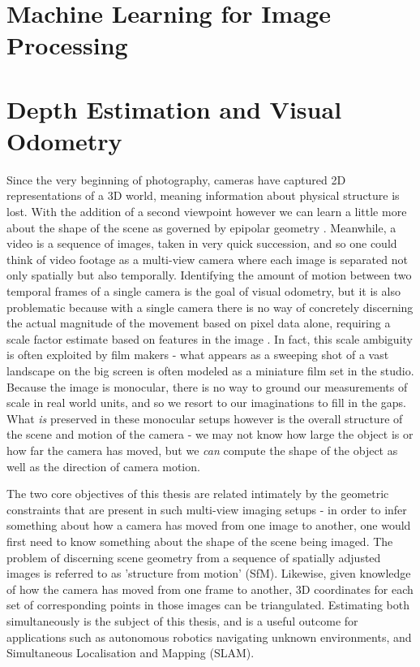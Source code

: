 \documentclass[openany]{book}
\begin{document}
\section{Machine Learning for Image Processing}



\section{Depth Estimation and Visual Odometry}

Since the very beginning of photography, cameras have captured 2D representations of a 3D world, meaning information about physical structure is lost. With the addition of a second viewpoint however we can learn a little more about the shape of the scene as governed by epipolar geometry \cite{zisserman2004multiview}. Meanwhile, a video is a sequence of images, taken in very quick succession, and so one could think of video footage as a multi-view camera where each image is separated not only spatially but also temporally. Identifying the amount of motion between two temporal frames of a single camera is the goal of visual odometry, but it is also problematic because with a single camera there is no way of concretely discerning the actual magnitude of the movement based on pixel data alone, requiring a scale factor estimate based on features in the image \cite{gakne2018scale, nister2004vo, zhou2016scale, zhou2019scale}. In fact, this scale ambiguity is often exploited by film makers - what appears as a sweeping shot of a vast landscape on the big screen is often modeled as a miniature film set in the studio. Because the image is monocular, there is no way to ground our measurements of scale in real world units, and so we resort to our imaginations to fill in the gaps. What \textit{is} preserved in these monocular setups however is the overall structure of the scene and motion of the camera - we may not know how large the object is or how far the camera has moved, but we \textit{can} compute the shape of the object as well as the direction of camera motion.


The two core objectives of this thesis are related intimately by the geometric constraints that are present in such multi-view imaging setups - in order to infer something about how a camera has moved from one image to another, one would first need to know something about the shape of the scene being imaged. The problem of discerning scene geometry from a sequence of spatially adjusted images is referred to as 'structure from motion' (SfM). Likewise, given knowledge of how the camera has moved from one frame to another, 3D coordinates for each set of corresponding points in those images can be triangulated. Estimating both simultaneously is the subject of this thesis, and is a useful outcome for applications such as autonomous robotics navigating unknown environments, and Simultaneous Localisation and Mapping (SLAM).
\end{document}
